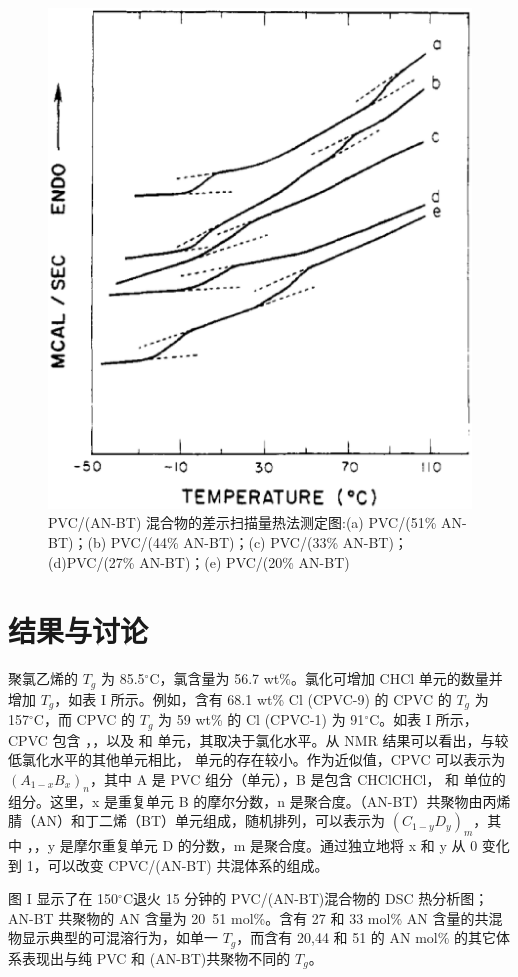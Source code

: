 \documentclass[a4paper,transmag,12pt]{IEEEtran}    %
\newcommand{\cdegree}{$^{\circ}$C}  %
\begin{document}
\begin{figure}[!htbp]
    \centering
    \includegraphics[width=.9\linewidth]{src/figure1.eps}
    \caption{PVC/(AN-BT) 混合物的差示扫描量热法测定图:(a) PVC/(51\% AN-BT)；(b) PVC/(44\% AN-BT)；(c) PVC/(33\% AN-BT)；(d)PVC/(27\% AN-BT)；(e) PVC/(20\% AN-BT)}
\end{figure}

\section{结果与讨论}
聚氯乙烯的 $T_g$ 为 85.5\cdegree，氯含量为 56.7 wt\%。氯化可增加 CHCl 单元的数量并增加 $T_g$，如表 I 所示。例如，含有 68.1 wt\% Cl (CPVC-9) 的 CPVC 的 $T_g$ 为 157\cdegree，而 CPVC 的 $T_g$ 为 59 wt\% 的 Cl (CPVC-1) 为 91\cdegree。如表 I 所示，CPVC 包含 ，，以及  和  单元，其取决于氯化水平。从  NMR 结果可以看出，与较低氯化水平的其他单元相比， 单元的存在较小。作为近似值，CPVC 可以表示为 $(A_{1-x}B_x)_n$，其中 A 是 PVC 组分（单元），B 是包含 CHClCHCl， 和  单位的组分。这里，x 是重复单元 B 的摩尔分数，n 是聚合度。（AN-BT）共聚物由丙烯腈（AN）和丁二烯（BT）单元组成，随机排列，可以表示为 $(C_{1-y}D_y)_m$，其中 ，，y 是摩尔重复单元 D 的分数，m 是聚合度。通过独立地将 x 和 y 从 0 变化到 1，可以改变 CPVC/(AN-BT) 共混体系的组成。\par{}
图 I 显示了在 150\cdegree 退火 15 分钟的 PVC/(AN-BT)混合物的 DSC 热分析图；AN-BT 共聚物的 AN 含量为 20~51 mol\%。含有 27 和 33 mol\% AN 含量的共混物显示典型的可混溶行为，如单一 $T_g$，而含有 20,44 和 51 的 AN mol\% 的其它体系表现出与纯 PVC 和 (AN-BT)共聚物不同的 $T_g$。\par{}
\end{document}
